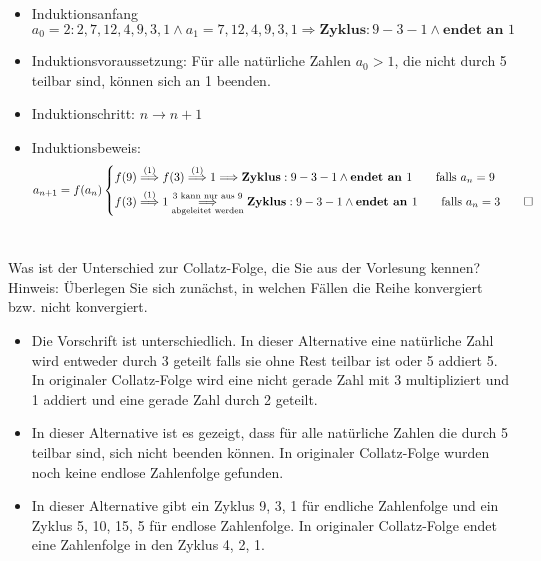 \documentclass{article}
\begin{document}
\begin{flushleft}
\begin{itemize}
    \item Induktionsanfang $a_0 = 2: 2, 7, 12, 4, 9, 3, 1 \land a_1 = 7, 12, 4, 9, 3, 1\Longrightarrow \textbf{Zyklus}: 9-3-1 \land \textbf{endet an } 1$
    \item Induktionsvoraussetzung: Für alle natürliche Zahlen $a_0 > 1$, die nicht durch 5 teilbar sind, können sich an 1 beenden.
    \item Induktionschritt: $n \longrightarrow n+1$ 
    \item Induktionsbeweis: 
    $$ a_{n + 1} = f(a_n)\left\{
    \begin{aligned}
        &f(9) \overset{(1)}{\Longrightarrow} f(3) \overset{(1)}{\Longrightarrow} 1 \Longrightarrow \textbf{Zyklus}: 9-3-1 \land \textbf{endet an } 1
        \qquad\text{falls } a_n = 9 \\
        &f(3) \overset{(1)}{\Longrightarrow} 1 \underset{\text{abgeleitet werden}}{\overset{\text{3 kann nur aus 9}}{\Longrightarrow}} \textbf{Zyklus}: 9-3-1
        \land \textbf{endet an } 1 
        \qquad\text{falls } a_n = 3 \qed
    \end{aligned}
    \right.
    $$ \\
     
\end{itemize}
Was ist der Unterschied zur Collatz-Folge, die Sie aus der Vorlesung kennen?
Hinweis: Überlegen Sie sich zunächst, in welchen Fällen die Reihe konvergiert bzw. nicht konvergiert.
\newline
\begin{itemize}
    \item Die Vorschrift ist unterschiedlich. In dieser Alternative eine natürliche Zahl wird entweder durch 3 geteilt 
    falls sie ohne Rest teilbar ist oder 5 addiert 5. In originaler Collatz-Folge wird eine nicht gerade Zahl mit 3 
    multipliziert und 1 addiert und eine gerade Zahl durch 2 geteilt.
    \item In dieser Alternative ist es gezeigt, dass für alle natürliche Zahlen die durch 5 teilbar sind, sich nicht beenden 
    können. In originaler Collatz-Folge wurden noch keine endlose Zahlenfolge gefunden.
    \item In dieser Alternative gibt ein Zyklus 9, 3, 1 für endliche Zahlenfolge und ein Zyklus 5, 10, 15, 5 für endlose 
    Zahlenfolge. In originaler Collatz-Folge endet eine Zahlenfolge in den Zyklus 4, 2, 1.
\end{itemize}
\end{flushleft}
\end{document}
